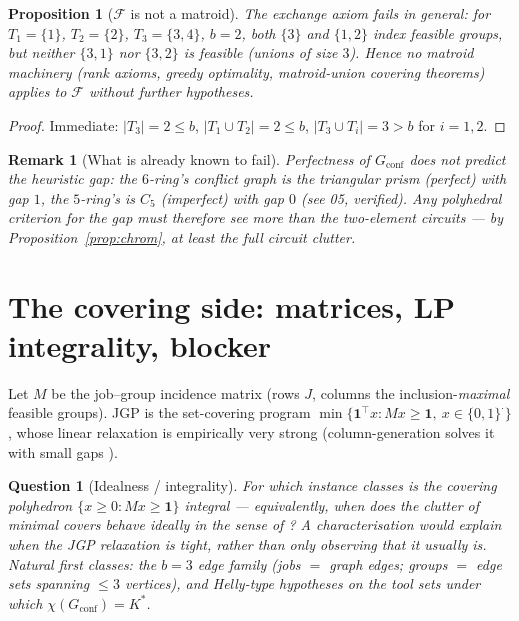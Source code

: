 \documentclass[11pt,a4paper]{article}
\newtheorem{proposition}{Proposition}
\newtheorem{question}{Question}
\newtheorem{remark}{Remark}
\newcommand{\Kstar}{K^{\ast}}
\begin{document}
\begin{proposition}[$\mathcal{F}$ is not a matroid]\label{prop:nonmatroid}
The exchange axiom fails in general: for $T_1=\{1\}$, $T_2=\{2\}$,
$T_3=\{3,4\}$, $b=2$, both $\{3\}$ and $\{1,2\}$ index feasible groups, but
neither $\{3,1\}$ nor $\{3,2\}$ is feasible (unions of size $3$). Hence no
matroid machinery (rank axioms, greedy optimality, matroid-union covering
theorems) applies to $\mathcal{F}$ without further hypotheses.
\end{proposition}
\begin{proof}
Immediate: $\lvert T_3\rvert=2\le b$, $\lvert T_1\cup T_2\rvert=2\le b$,
$\lvert T_3\cup T_i\rvert=3>b$ for $i=1,2$.
\end{proof}

\begin{remark}[What is already known to fail]
Perfectness of $G_{\mathrm{conf}}$ does not predict the heuristic gap: the
$6$-ring's conflict graph is the triangular prism (perfect) with gap $1$, the
$5$-ring's is $C_5$ (imperfect) with gap $0$ (see 05, verified). Any polyhedral
criterion for the gap must therefore see more than the two-element circuits ---
by Proposition~\ref{prop:chrom}, at least the full circuit clutter.
\end{remark}

\section{The covering side: matrices, LP integrality, blocker}

Let $M$ be the job--group incidence matrix (rows $J$, columns the
inclusion-\emph{maximal} feasible groups). JGP is the set-covering program
$\min\{\mathbf 1^\top x: Mx\ge\mathbf 1,\ x\in\{0,1\}^{\cdot}\}$, whose linear
relaxation is empirically very strong (column-generation solves it with small
gaps \citep{Crama1994Column,Otiai2026}).

\begin{question}[Idealness / integrality]\label{q:ideal}
For which instance classes is the covering polyhedron
$\{x\ge0: Mx\ge\mathbf 1\}$ integral --- equivalently, when does the clutter of
minimal covers behave ideally in the sense of \citet{Cornuejols2001}? A
characterisation would explain \emph{when} the JGP relaxation is tight, rather
than only observing that it usually is. Natural first classes: the $b=3$ edge
family (jobs $=$ graph edges; groups $=$ edge sets spanning $\le3$ vertices),
and Helly-type hypotheses on the tool sets under which
$\chi(G_{\mathrm{conf}})=\Kstar$.
\end{question}
\end{document}
